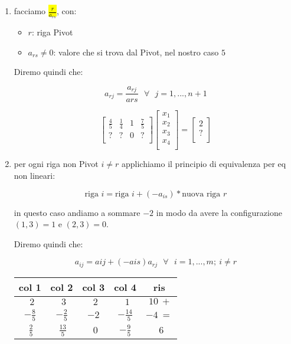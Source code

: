 \begin{enumerate}
	\item facciamo \hl{$\frac{r}{a_{rs}}$}, con:
		
		\begin{itemize}
			\item $r$: riga Pivot
			\item $a_{rs} \neq 0$: valore che si trova dal Pivot, nel nostro caso $5$
		\end{itemize}
		
		Diremo quindi che:
		
		$$a_{rj} = \frac{a_{rj}}{a{rs}}\ \ \ \forall\ \ \ j = 1, ..., n+1$$

		$$
		\left[ {\begin{array}{cccc}
			\frac{4}{5} & \frac{1}{4} & 1 & \frac{7}{5} \\
			? & ? & 0 & ? \\
		\end{array} } \right]
		\left[ {\begin{array}{c}
			x_1 \\
			x_2 \\
			x_3 \\
			x_4 \\
		\end{array} } \right]
		=
		\left[ {\begin{array}{c}
			2 \\
			? \\
		\end{array} } \right]
		$$
	
	\item per ogni riga non Pivot $i \neq r$ applichiamo il principio di equivalenza per eq non lineari:
	
		$$\text{riga } i = \text{riga } i + (-a_{is}) * \text{nuova riga } r$$
		
		in questo caso andiamo a sommare $-2$ in modo da avere la configurazione $(1, 3) = 1$ e $(2, 3) = 0$.
		
		Diremo quindi che:
		
		$$a_{ij} = a{ij} + (-a{is})a_{rj}\ \ \ \forall\ \ \ i = 1, ..., m;\ i \neq r$$
		
		\begin{table}[!h]
		    \begin{center}
				\def\arraystretch{2}
		    	\begin{tabular}{| c c c c | c |}
		    	    \hline
		    	    \textbf{col 1} & \textbf{col 2} & \textbf{col 3} & \textbf{col 4} & \textbf{ris} \\\hline
		    	    $\ \ 2$ & $\ \ 3$ & $\ \ 2$ & $\ \ 1$ & $\ 10\ +$ \\
		     		$-\frac{8}{5}$ & $-\frac{2}{5}$ & $-2$ & $-\frac{14}{5}$ & $-4\ =$ \\\hline
		     		$\ \frac{2}{5}$ & $\ \frac{13}{5}$ & $\ \ 0$ & $-\frac{9}{5}$ & $\ \ 6$ \\
					\hline
		    \end{tabular}
		\end{center}
		\end{table}
		

\end{enumerate}
